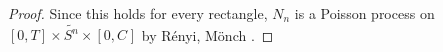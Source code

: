 \documentclass[12pt]{article}
\renewcommand{\S}{S}							%
\newcommand{\poiss}[1]{N_{#1}}						%
\newcommand{\numb}{n}								%
\newcommand{\const}[1]{C_{#1}}						%
\newcommand{\alt}{\widetilde}						%
\begin{document}
\begin{proof}
Since this holds for every rectangle, \(\poiss{\numb}\) is a Poisson process on \([0,T]\times \alt{\S^\numb}\times [0,\const{}]\) by R\'enyi, M\"onch \cite[Theorem 9.2.XII]{DalVer08}.



\end{proof}

\newpage


\end{document}
